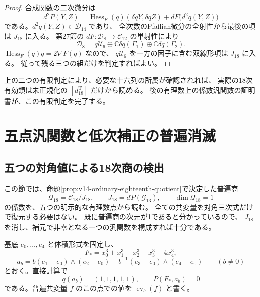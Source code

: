 \documentclass[a4paper,11pt]{ltjsarticle}
\theoremstyle{definition}
\newcommand{\CC}{\mathbb C}
\begin{document}
\begin{proof}
合成関数の二次微分は
\[
 d^2P(Y,Z)=\operatorname{Hess}_F(q)(\delta qY,\delta qZ)
                      +dF\bigl(d^2q(Y,Z)\bigr)
\]
である。$d^2q(Y,Z)\in\mathcal D_{14}$ であり、
全次数のPfaffian微分の全射性から最後の項は $J_{18}$ に入る。
第27節の $dF:\mathcal D_8\to\mathcal C_{12}$ の単射性により
\[
 \mathcal D_8=q\mathcal U_6\oplus
       \CC\delta q(\Gamma_1)\oplus\CC\delta q(\Gamma_2).
\]
$\operatorname{Hess}_F(q)q=2\nabla F(q)$ なので、
$q\mathcal U_6$ を一方の因子に含む双線形項は $J_{18}$ に入る。
従って残る三つの組だけを判定すればよい。
\end{proof}

上の二つの有限判定により、必要な十六列の所属が確認されれば、
実際の18次有効類は未正規化の $[d^{\mathrm T}_{18}]$ だけから読める。
後の有理数上の係数汎関数の証明書が、この有限判定を完了する。



\section{五点汎関数と低次補正の普遍消滅}
\label{sec:v14-five-point}

\subsection{五つの対角値による18次商の検出}
\label{subsec:v14-five-point-detector}

この節では、命題\ref{prop:v14-ordinary-eighteenth-quotient}で決定した普遍商
\[
 \mathcal Q_{18}=\mathcal C_{18}/J_{18},\qquad
 J_{18}=dP(\mathcal G_{13}),\qquad
 \dim\mathcal Q_{18}=1
\]
の係数を、五つの明示的な有理数点から読む。
全ての共変量を対角三次式だけで復元する必要はない。
既に普遍商の次元が1であると分かっているので、
$J_{18}$ を消し、補元で非零となる一つの汎関数を構成すれば十分である。

基底 $e_0,\ldots,e_4$ と体積形式を固定し、
\[
 F_*=x_0^3+x_1^3+x_2^3+x_3^3-4x_4^3,
\]
\[
 a_b=b(e_1-e_0)\wedge(e_2-e_0)
       +b^{-1}(e_3-e_0)\wedge(e_4-e_0)
 \qquad (b\ne0)
\]
とおく。直接計算で
\[
 q(a_b)=(1,1,1,1,1),\qquad P(F_*,a_b)=0
\]
である。普遍共変量 $f$ のこの点での値を $\operatorname{ev}_b(f)$ と書く。
\end{document}
